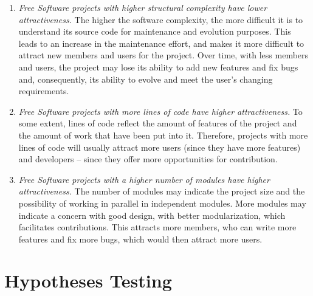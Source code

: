 \documentclass[conference]{IEEEtran}
\begin{document}
\begin{enumerate}
\item \emph{Free Software projects with higher structural complexity have
lower attractiveness.}
%
The higher the software complexity, the more difficult it is to understand
its source code for maintenance and evolution purposes.
%
This leads to an increase in the maintenance effort, and makes it more
difficult to attract new members and users for the project.
%
Over time, with less members and users, the project may lose its ability to
add new features and fix bugs and, consequently, its ability to evolve and meet
the user's changing requirements.

\item \emph{Free Software projects with more lines of code have
higher attractiveness.}
%
To some extent, lines of code reflect the amount of features of the project and
the amount of work that have been put into it.
%
Therefore, projects with more lines of code will usually attract more users
(since they have more features) and developers -- since they offer more 
opportunities for contribution.

\item \emph{Free Software projects with a higher number of modules have
higher attractiveness.}
%
The number of modules may indicate the project size and the possibility
of working in parallel in independent modules.
%
More modules may indicate a concern with good design, with better modularization,
which facilitates contributions.
%
This attracts more members, who can write more features and fix more bugs,
which would then attract more users.
\end{enumerate}


\section{Hypotheses Testing}   
\label{hypothesesTesting}
\end{document}
